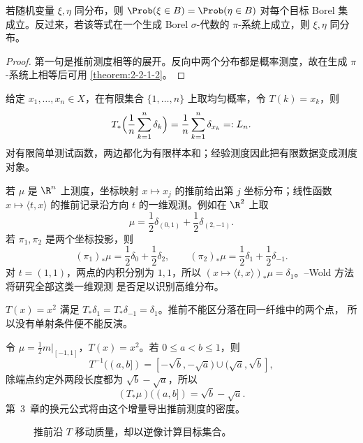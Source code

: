 \begin{proposition}[分布的集合层识别]\label{proposition:2-3-1-4}
若随机变量 $\xi,\eta$ 同分布，则
$\Prob(\xi\in B)=\Prob(\eta\in B)$ 对每个目标 Borel 集成立。反过来，若该等式在一个生成
Borel $\sigma$-代数的 $\pi$-系统上成立，则 $\xi,\eta$ 同分布。
\end{proposition}

\begin{proof}
第一句是推前测度相等的展开。反向中两个分布都是概率测度，故在生成 $\pi$-系统上相等后可用
\cref{theorem:2-2-1-2}。
\end{proof}

\begin{example}[经验测度]\label{ex:2-3-1-1}
给定 $x_1,\dots,x_n\in X$，在有限集合 $\{1,\dots,n\}$ 上取均匀概率，令 $T(k)=x_k$，则
\[
 T_*\Bigl(\frac1n\sum_{k=1}^n\delta_k\Bigr)
 =\frac1n\sum_{k=1}^n\delta_{x_k}=:L_n.
\]
对有限简单测试函数，两边都化为有限样本和；经验测度因此把有限数据变成测度对象。
\end{example}

\begin{example}[坐标分布]\label{ex:2-3-1-2}
若 $\mu$ 是 $\R^n$ 上测度，坐标映射 $x\mapsto x_j$ 的推前给出第 $j$ 坐标分布；线性函数
$x\mapsto\langle t,x\rangle$ 的推前记录沿方向 $t$ 的一维观测。例如在 \(\R^2\) 上取
\[
 \mu=\frac12\delta_{(0,1)}+\frac12\delta_{(2,-1)}.
\]
若 \(\pi_1,\pi_2\) 是两个坐标投影，则
\[
 (\pi_1)_*\mu=\frac12\delta_0+\frac12\delta_2,\qquad
 (\pi_2)_*\mu=\frac12\delta_1+\frac12\delta_{-1}.
\]
对 \(t=(1,1)\)，两点的内积分别为 \(1,1\)，所以
\((x\mapsto\langle t,x\rangle)_*\mu=\delta_1\)。\Cramer{}--Wold 方法将研究全部这类一维观测
是否足以识别高维分布。
\end{example}

\begin{example}[非单射丢失信息]\label{ex:2-3-1-3}
$T(x)=x^2$ 满足 $T_*\delta_1=T_*\delta_{-1}=\delta_1$。推前不能区分落在同一纤维中的两个点，
所以没有单射条件便不能反演。
\end{example}

\begin{example}[平方折叠的集合计算]\label{ex:2-3-1-4}
令 $\mu=\tfrac12m|_{[-1,1]}$，$T(x)=x^2$。若 $0\le a<b\le1$，则
\[
 T^{-1}((a,b])=[-\sqrt b,-\sqrt a)\cup(\sqrt a,\sqrt b],
\]
除端点约定外两段长度都为 $\sqrt b-\sqrt a$，所以
\[
 (T_*\mu)((a,b])=\sqrt b-\sqrt a.
\]
第~3~章的换元公式将由这个增量导出推前测度的密度。
\end{example}

\begin{figure}[htbp]
\centering
{}
\caption{推前沿 $T$ 移动质量，却以逆像计算目标集合。}
\label{fig:pushforward-fibres}
\end{figure}

